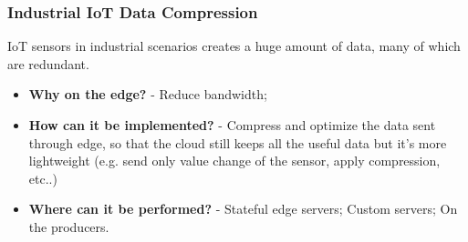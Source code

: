 \subsubsection{Industrial IoT Data Compression}
IoT sensors in industrial scenarios creates a huge amount of data, many of which are redundant.
\begin{itemize}
    \item \textbf{Why on the edge?} - Reduce bandwidth;
    \item \textbf{How can it be implemented?} - Compress and optimize the data sent through edge, so that the cloud still keeps all the useful data but it’s more lightweight (e.g. send only value change of the sensor, apply compression, etc..)
    \item \textbf{Where can it be performed?} - Stateful edge servers; Custom servers; On the producers.
\end{itemize}
